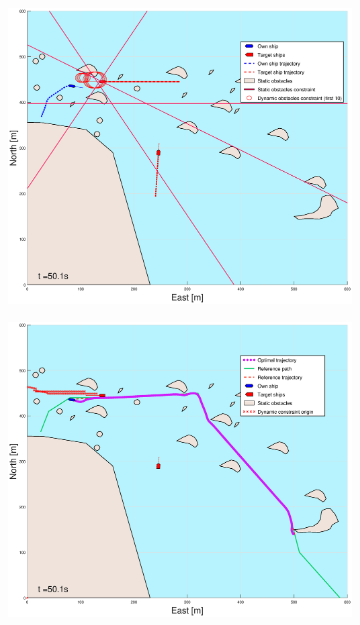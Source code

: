 \begin{figure}[!ht]
\begin{subfigure}[b]{0.499\textwidth}
    \end{subfigure}
    \hfill
    \\
    \begin{subfigure}[b]{0.49\textwidth}
        \centering
        \includegraphics[width=\textwidth]{Images/Figures/skjergard_m_trafikk_NEW/_Simple_0fig1_time=50}
    \end{subfigure}
    \hfill
    \begin{subfigure}[b]{0.499\textwidth}
        \centering
        \includegraphics[width=\textwidth]{Images/Figures/skjergard_m_trafikk_NEW/_Simple_0fig999_time=50}

\end{subfigure}
\end{figure}
